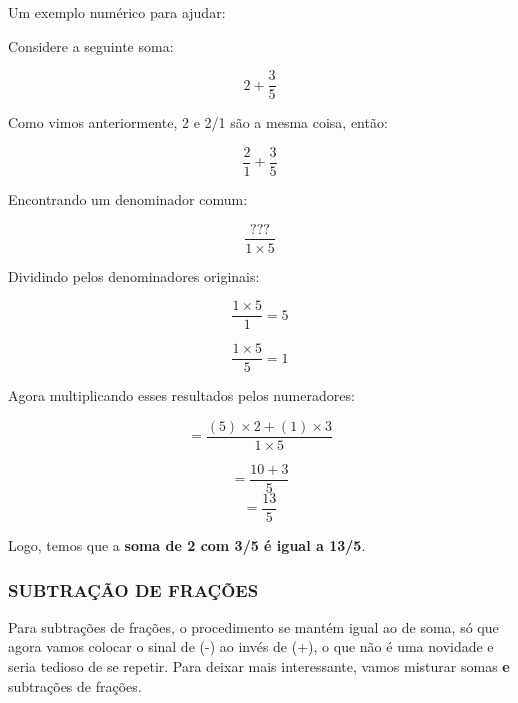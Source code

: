Um exemplo numérico para ajudar:

\begin{exemplo}
    Considere a seguinte soma:

    \begin{equation}
        2 + \frac{3}{5}
    \end{equation}

    Como vimos anteriormente, 2 e 2/1 são a mesma coisa, então:

    \begin{equation}
        \frac{2}{1} + \frac{3}{5}
    \end{equation}

    Encontrando um denominador comum:

    \begin{equation}
        \frac{???}{1\times5}
    \end{equation}

    Dividindo pelos denominadores originais:

    \begin{equation}
        \frac{1\times5}{1}=5
    \end{equation}

    \begin{equation}
        \frac{1\times 5}{5}=1
    \end{equation}

    Agora multiplicando esses resultados pelos numeradores:

    \begin{equation}
        =\frac{(5)\times2 + (1)\times 3}{1\times5}
    \end{equation}

    \begin{equation}
        =\frac{10+3}{5}
    \end{equation}
    \begin{equation}
        =\frac{13}{5}
    \end{equation}

    Logo, temos que a \textbf{soma de 2 com 3/5 é igual a 13/5}.
\end{exemplo}


\subsubsection{SUBTRAÇÃO DE FRAÇÕES}

Para subtrações de frações, o procedimento se mantém igual ao de soma, só que agora vamos colocar o sinal de (-) ao invés de (+), o que não é uma novidade e seria tedioso de se repetir. Para deixar mais interessante, vamos misturar somas \textbf{e} subtrações de frações.


